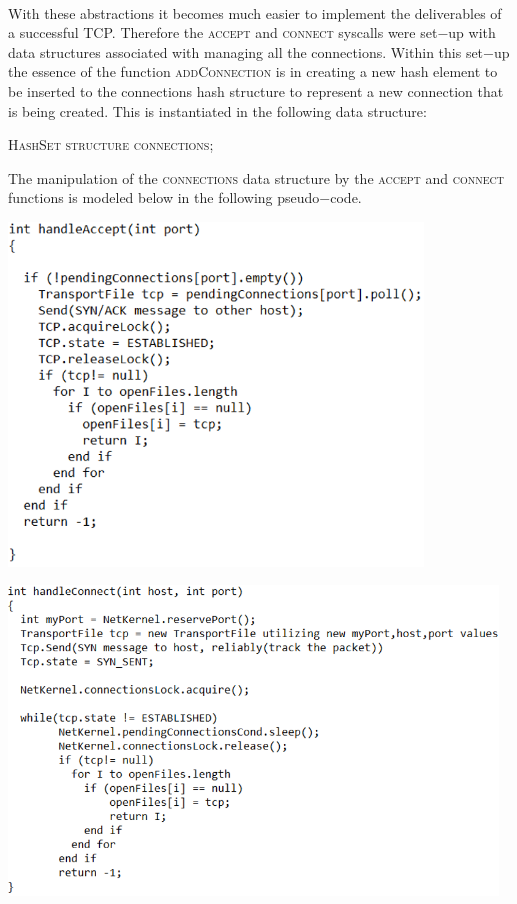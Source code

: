 \documentclass[12pt]{article}
\begin{document}
{    \paragraph{} With these abstractions it becomes much easier to implement the deliverables of a successful TCP.
    Therefore the \textsc{accept} and \textsc{connect} syscalls were set$-$up with data structures associated with managing all the connections.
    Within this set$-$up the essence of the function \textsc{addConnection} is in creating a new hash element to be inserted to the connections hash structure to represent a new connection that is being created. 
    This is instantiated in the following data structure:
    \begin{center} \textsc{HashSet structure connections}; \end{center}
    The manipulation of the \textsc{connections} data structure by the \textsc{accept} and \textsc{connect} functions is modeled below in the following pseudo$-$code.
\begin{center} \includegraphics[width=110mm]{Accept.png} \end{center}
\begin{center} \includegraphics[width=130mm]{Connect.png} \end{center}
}
\end{document}
